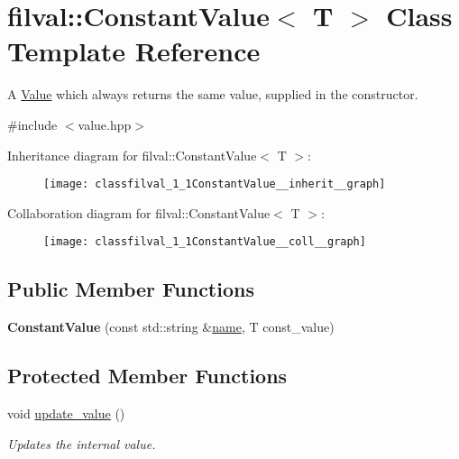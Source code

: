 \hypertarget{classfilval_1_1ConstantValue}{}\section{filval\+:\+:Constant\+Value$<$ T $>$ Class Template Reference}
\label{classfilval_1_1ConstantValue}


A \hyperlink{classfilval_1_1Value}{Value} which always returns the same value, supplied in the constructor.  




{\ttfamily \#include $<$value.\+hpp$>$}



Inheritance diagram for filval\+:\+:Constant\+Value$<$ T $>$\+:
\nopagebreak
\begin{figure}[H]
\begin{center}
\leavevmode
\texttt{[image: classfilval\_1\_1ConstantValue\_\_inherit\_\_graph]}
\end{center}
\end{figure}


Collaboration diagram for filval\+:\+:Constant\+Value$<$ T $>$\+:
\nopagebreak
\begin{figure}[H]
\begin{center}
\leavevmode
\texttt{[image: classfilval\_1\_1ConstantValue\_\_coll\_\_graph]}
\end{center}
\end{figure}
\subsection*{Public Member Functions}
\begin{DoxyCompactItemize}
\item 
\hypertarget{classfilval_1_1ConstantValue_a82dc383c6de04053609df055adda57ca}{}\label{classfilval_1_1ConstantValue_a82dc383c6de04053609df055adda57ca} 
{\bfseries Constant\+Value} (const std\+::string \&\hyperlink{classfilval_1_1GenValue_a007e38c03ee041c2a657afa3d6e91ab1}{name}, T const\+\_\+value)
\end{DoxyCompactItemize}
\subsection*{Protected Member Functions}
\begin{DoxyCompactItemize}
\item 
void \hyperlink{classfilval_1_1ConstantValue_a2814dd032b5688fc91e844f1592d1b09}{update\+\_\+value} ()
\begin{DoxyCompactList}\small\item\em Updates the internal value. \end{DoxyCompactList}\end{DoxyCompactItemize}
